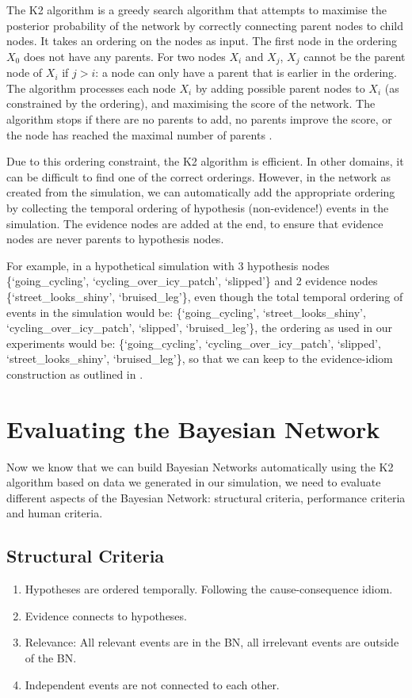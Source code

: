 The K2 algorithm is a greedy search algorithm that attempts to maximise the posterior probability of the network by correctly connecting parent nodes to child nodes. It takes an ordering on the nodes as input. The first node in the ordering $X_0$ does not have any parents. For two nodes $X_i$ and $X_j$, $X_j$ cannot be the parent node of $X_i$ if $j > i$: a node can only have a parent that is earlier in the ordering. The algorithm processes each node $X_i$ by adding possible parent nodes to $X_i$ (as constrained by the ordering), and maximising the score of the network. The algorithm stops if there are no parents to add, no parents improve the score, or the node has reached the maximal number of parents \citep{Chen2008}.

Due to this ordering constraint, the K2 algorithm is efficient. In other domains, it can be difficult to find one of the correct orderings. However, in the network as created from the simulation, we can automatically add the appropriate ordering by collecting the temporal ordering of hypothesis (non-evidence!) events in the simulation. The evidence nodes are added at the end, to ensure that evidence nodes are never parents to hypothesis nodes. 

For example, in a hypothetical simulation with 3 hypothesis nodes \{`going\_cycling', `cycling\_over\_icy\_patch', `slipped'\} and 2 evidence nodes \{`street\_looks\_shiny', `bruised\_leg'\}, even though the total temporal ordering of events in the simulation would be:  \{`going\_cycling', `street\_looks\_shiny', `cycling\_over\_icy\_patch', `slipped', `bruised\_leg'\}, the ordering as used in our experiments would be: \{`going\_cycling', `cycling\_over\_icy\_patch', `slipped', `street\_looks\_shiny', `bruised\_leg'\}, so that we can keep to the evidence-idiom construction as outlined in \citet{Fenton2012}.



\section{Evaluating the Bayesian Network}

Now we know that we can build Bayesian Networks automatically using the K2 algorithm based on data we generated in our simulation, we need to evaluate different aspects of the Bayesian Network: structural criteria, performance criteria and human criteria.

\subsection{Structural Criteria}
\begin{enumerate}
\item Hypotheses are ordered temporally. Following the cause-consequence idiom.
\item Evidence connects to hypotheses.
\item Relevance: All relevant events are in the BN, all irrelevant events are outside of the BN.
\item Independent events are not connected to each other.
\end{enumerate}

